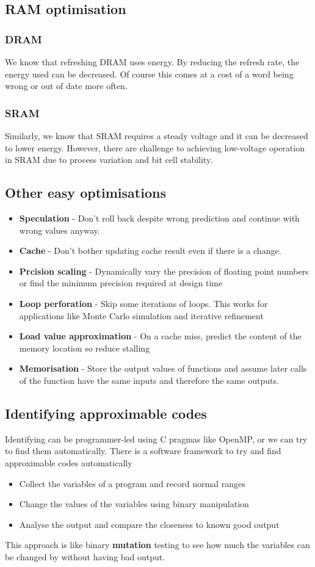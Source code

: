 \documentclass[11pt]{article}
\begin{document}
\subsection{RAM optimisation}
\subsubsection*{DRAM}
We know that refreshing DRAM uses energy. By reducing the refresh rate, the energy used can be decreased. Of course this comes at a cost of a word being wrong or out of date more often.

\subsubsection*{SRAM}
Similarly, we know that SRAM requires a steady voltage and it can be decreased to lower energy. However, there are challenge to achieving low-voltage operation in SRAM due to process variation and bit cell stability. 

\subsection{Other easy optimisations}
\begin{itemize}
\item \textbf{Speculation} - Don't roll back despite wrong prediction and continue with wrong values anyway. 
\item \textbf{Cache} - Don't bother updating cache result even if there is a change.
\item \textbf{Prcision scaling} - Dynamically vary the precision of floating point numbers or find the minimum precision required at design time
\item \textbf{Loop perforation} - Skip some iterations of loops. This works for applications like Monte Carlo simulation and iterative refinement
\item \textbf{Load value approximation} - On a cache miss, predict the content of the memory location so reduce stalling
\item \textbf{Memorisation} - Store the output values of functions and assume later calls of the function have the same inputs and therefore the same outputs. 
\end{itemize}

\subsection{Identifying approximable codes}
Identifying can be programmer-led using C pragmas like OpenMP, or we can try to find them automatically.
\n
There is a software framework to try and find approximable codes automatically
\begin{itemize}
\item Collect the variables of a program and record normal ranges
\item Change the values of the variables using binary manipulation
\item Analyse the output and compare the closeness to known good output
\end{itemize}
This approach is like binary \textbf{mutation} testing to see how much the variables can be changed by without having bad output. 
\end{document}
